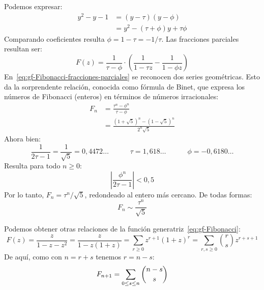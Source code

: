   Podemos expresar:
  \begin{align*}
    y^2 - y - 1
      &= (y - \tau) (y - \phi) \\
      &= y^2 - (\tau + \phi) y + \tau \phi
  \end{align*}
  Comparando coeficientes
  resulta \(\phi = 1 - \tau = -1 / \tau\).
  Las fracciones parciales resultan ser:
  \begin{equation}
    \label{eq:gf-Fibonacci-fracciones-parciales}
    F(z) = \frac{1}{\tau - \phi} \cdot
	     \left(
		\frac{1}{1 - \tau z} - \frac{1}{1 - \phi z}
	     \right)
  \end{equation}
  En~\eqref{eq:gf-Fibonacci-fracciones-parciales}
  se reconocen dos series geométricas.
  Esto da la sorprendente relación,
  conocida como fórmula de Binet,%
  que expresa los números de Fibonacci
  (enteros)
  en términos de números irracionales:%
  \begin{align}
    F_n
      &= \frac{\tau^n - \phi^n}{\tau - \phi} \\
      &= \frac{(1 + \sqrt{5})^n - (1 - \sqrt{5})^n}{2^n \sqrt{5}}
	   \label{eq:Binet-Fibonacci}
  \end{align}
  Ahora bien:
  \begin{equation*}
    \frac{1}{2 \tau - 1}
      = \frac{1}{\sqrt{5}}
      = 0,4472\dotso
    \hspace{3em}
    \tau
      = 1,618\dotso
    \hspace{3em}
    \phi
      = -0,6180\dotso
  \end{equation*}
  Resulta para todo \(n \ge 0\):
  \begin{equation*}
    \left| \frac{\phi^n}{2 \tau - 1} \right| < 0,5
  \end{equation*}
  Por lo tanto,
  \(F_n = \tau^n / \sqrt{5}\),
  redondeado al entero más cercano.
  De todas formas:%
  \begin{equation}
    \label{eq:Fibonacci-asymptotic}
    F_n
      \sim \frac{\tau^n}{\sqrt{5}}
  \end{equation}

  Podemos obtener otras relaciones
  de la función generatriz~\eqref{eq:gf-Fibonacci}:
  \begin{equation*}
    F(z)
      = \frac{z}{1 - z - z^2}
      = \frac{z}{1 - z(1 + z)}
      = \sum_{r \ge 0} z^{r + 1} (1 + z)^r
      = \sum_{r, s \ge 0} \binom{r}{s} z^{r + s + 1}
  \end{equation*}
  De aquí,
  como con \(n = r + s\) tenemos \(r = n - s\):
  \begin{equation}
    \index{Fibonacci, numeros de@Fibonacci, números de!relacion con coeficientes binomiales@relación con coeficientes binomiales}
    \label{eq:Fibonacci-binomial}
    F_{n + 1}
      = \sum_{0 \le s \le n} \binom{n - s}{s}
  \end{equation}

